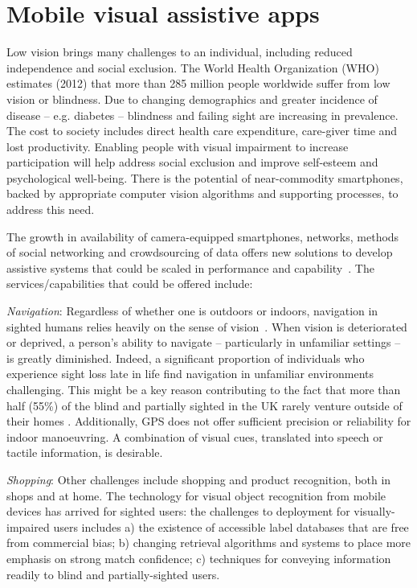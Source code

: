 \section{Mobile visual assistive apps}

Low vision brings many challenges to an individual, including reduced independence and social exclusion. The World Health Organization (WHO) estimates (2012) that more than 285 million people worldwide suffer from low vision or blindness. Due to changing demographics and greater incidence of disease -- e.g. diabetes -- blindness and failing sight are increasing in prevalence.  The cost to society includes direct health care expenditure, care-giver time and lost productivity.  Enabling people with visual impairment to increase participation will help address social exclusion and improve self-esteem and psychological well-being. There is the potential of near-commodity smartphones, backed by appropriate computer vision algorithms and supporting processes, to address this need.

The growth in availability of camera-equipped smartphones, networks, methods of social networking and crowdsourcing of data offers new solutions to develop assistive systems that could be scaled in performance and capability~\cite{Manduchi2012,Worsfold2010}. The services/capabilities that could be offered include:

\emph{Navigation}: Regardless of whether one is outdoors or indoors, navigation in sighted humans relies heavily on the sense of vision~\citep{kalia2008learning,tsuji2005landmarks}. When vision is deteriorated or deprived, a person's ability to navigate -- particularly in unfamiliar settings -- is greatly diminished. Indeed, a significant proportion of individuals who experience sight loss late in life find navigation in unfamiliar environments challenging. This might be a key reason contributing to the fact that more than half (55\%) of the blind and partially sighted in the UK rarely venture outside of their homes \citep{Worsfold2010}. Additionally, GPS does not offer sufficient precision or reliability for indoor manoeuvring. A combination of visual cues, translated into speech or tactile information, is desirable.

\emph{Shopping}: Other challenges include shopping and product recognition, both in shops and at home. The technology for visual object recognition from mobile devices has arrived for sighted users: the challenges to deployment for visually-impaired users includes a) the existence of accessible label databases that are free from commercial bias; b) changing retrieval algorithms and systems to place more emphasis on strong match confidence; c) techniques for conveying information readily to blind and partially-sighted users.

